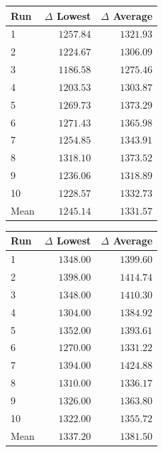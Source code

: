 \begin{table}[H]
    \centering
    \begin{minipage}[t]{0.48\textwidth}
        \centering
        \label{tab:gain-normal-barabasi-albert-2}
        \small
        \setlength{\tabcolsep}{4pt}
        \begin{tabular}{lrr}
            \toprule
            \textbf{Run} & \textbf{$\Delta$ Lowest} & \textbf{$\Delta$ Average} \\
            \midrule
            1 & $1257.84$ & $1321.93$ \\
            2 & $1224.67$ & $1306.09$ \\
            3 & $1186.58$ & $1275.46$ \\
            4 & $1203.53$ & $1303.87$ \\
            5 & $1269.73$ & $1373.29$ \\
            6 & $1271.43$ & $1365.98$ \\
            7 & $1254.85$ & $1343.91$ \\
            8 & $1318.10$ & $1373.52$ \\
            9 & $1236.06$ & $1318.89$ \\
            10 & $1228.57$ & $1332.73$ \\
            \midrule
            Mean & $1245.14$ & $1331.57$ \\
            \bottomrule
        \end{tabular}
    \end{minipage}
    \hfill
    \begin{minipage}[t]{0.48\textwidth}
        \centering
        \label{tab:gain-binary-barabasi-albert-2}
        \small
        \setlength{\tabcolsep}{4pt}
        \begin{tabular}{lrr}
            \toprule
            \textbf{Run} & \textbf{$\Delta$ Lowest} & \textbf{$\Delta$ Average} \\
            \midrule
            1 & $1348.00$ & $1399.60$ \\
            2 & $1398.00$ & $1414.74$ \\
            3 & $1348.00$ & $1410.30$ \\
            4 & $1304.00$ & $1384.92$ \\
            5 & $1352.00$ & $1393.61$ \\
            6 & $1270.00$ & $1331.22$ \\
            7 & $1394.00$ & $1424.88$ \\
            8 & $1310.00$ & $1336.17$ \\
            9 & $1326.00$ & $1363.80$ \\
            10 & $1322.00$ & $1355.72$ \\
            \midrule
            Mean & $1337.20$ & $1381.50$ \\
            \bottomrule
        \end{tabular}
    \end{minipage}
\end{table}
